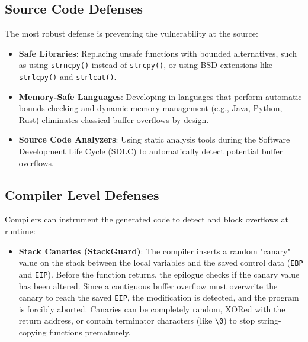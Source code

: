 \subsection{Source Code Defenses}
The most robust defense is preventing the vulnerability at the source:
\begin{itemize}
    \item \textbf{Safe Libraries}: Replacing unsafe functions with bounded alternatives, such as using \texttt{strncpy()} instead of \texttt{strcpy()}, or using BSD extensions like \texttt{strlcpy()} and \texttt{strlcat()}.
    \item \textbf{Memory-Safe Languages}: Developing in languages that perform automatic bounds checking and dynamic memory management (e.g., Java, Python, Rust) eliminates classical buffer overflows by design.
    \item \textbf{Source Code Analyzers}: Using static analysis tools during the Software Development Life Cycle (SDLC) to automatically detect potential buffer overflows.
\end{itemize}

\subsection{Compiler Level Defenses}
Compilers can instrument the generated code to detect and block overflows at runtime:
\begin{itemize}
    \item \textbf{Stack Canaries (StackGuard)}: The compiler inserts a random "canary" value on the stack between the local variables and the saved control data (\texttt{EBP} and \texttt{EIP}). Before the function returns, the epilogue checks if the canary value has been altered. Since a contiguous buffer overflow must overwrite the canary to reach the saved \texttt{EIP}, the modification is detected, and the program is forcibly aborted. Canaries can be completely random, XORed with the return address, or contain terminator characters (like \texttt{\textbackslash 0}) to stop string-copying functions prematurely.
\end{itemize}

